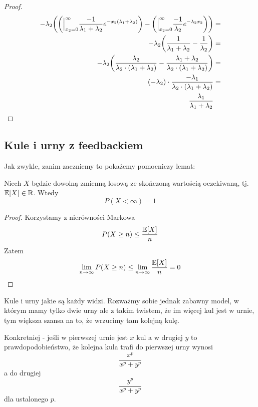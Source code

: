 \begin{proof}
\begin{align*}
		-\lambda_2 \pars{\pars{\Big\rvert_{x_2=0}^{\infty} \frac{-1}{\lambda_1 + \lambda_2} e^{-x_2(\lambda_1 + \lambda_2)}} - \pars{\Big\rvert_{x_2=0}^{\infty} \frac{-1}{\lambda_2} e^{-\lambda_2 x_2}}} & = \\
		-\lambda_2 \pars{\frac{1}{\lambda_1 + \lambda_2} - \frac{1}{\lambda_2}}                                                                                                                            & = \\
		-\lambda_2 \pars{\frac{\lambda_2}{\lambda_2 \cdot \pars{\lambda_1 + \lambda_2}} - \frac{\lambda_1 + \lambda_2}{\lambda_2 \cdot \pars{\lambda_1 + \lambda_2}}}                                      & = \\
		(-\lambda_2)\cdot \frac{-\lambda_1}{\lambda_2 \cdot \pars{\lambda_1 + \lambda_2}}                                                                                                                  & = \\
		\frac{\lambda_1}{\lambda_1 + \lambda_2}
	\end{align*}
\end{proof}

\newpage
\subsection{Kule i urny z feedbackiem}

Jak zwykle, zanim zaczniemy to pokażemy pomocniczy lemat:
\begin{lemma}
	\label{if-expected-is-finite-then-variable-is-finite}
	Niech \( X \) będzie dowolną zmienną losową ze skończoną wartością oczekiwaną, tj. \( \expected{X} \in \real \).
	Wtedy
	\[
		P(X < \infty) = 1
	\]
\end{lemma}
\begin{proof}
	Korzystamy z nierówności Markowa
	\[
		P(X \geq n) \leq \frac{\expected{X}}{n}
	\]
	Zatem
	\[
		\lim_{n \rightarrow \infty} P(X \geq n) \leq \lim_{n \rightarrow \infty} \frac{\expected{X}}{n} = 0
	\]
\end{proof}


Kule i urny jakie są każdy widzi. Rozważmy sobie jednak zabawny model, w którym mamy tylko dwie urny ale z takim twistem, że im więcej kul jest w urnie, tym większa szansa na to, że wrzucimy tam kolejną kulę.

Konkretniej - jeśli w pierwszej urnie jest \( x \) kul a w drugiej \( y \) to prawdopodobieństwo, że kolejna kula trafi do pierwszej urny wynosi \[ \frac{x^p}{x^p + y^p} \] a do drugiej \[ \frac{y^p}{x^p + y^p} \]
dla ustalonego \( p \).


